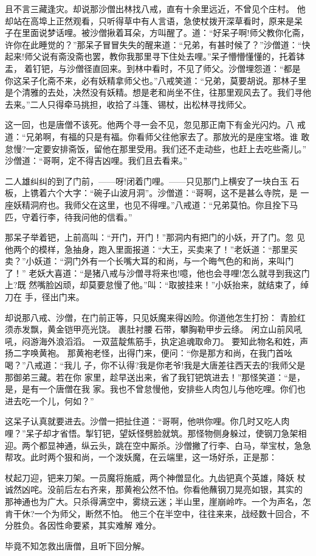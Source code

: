 且不言三藏逢灾。却说那沙僧出林找八戒，直有十余里远近，不曾见个庄村。
他却站在高埠上正然观看，只听得草中有人言语，急使杖拨开深草看时，原来是呆
子在里面说梦话哩。被沙僧揪着耳朵，方叫醒了。道：“好呆子啊!师父教你化斋，
许你在此睡觉的？”那呆子冒冒失失的醒来道：“兄弟，有甚时候了？”沙僧道：“快
起来!师父说有斋没斋也罢，教你我那里寻下住处去哩。”呆子懵懵懂懂的，托着钵
盂，着钉钯，与沙僧径直回来。到林中看时，不见了师父。沙僧埋怨道：“都是
你这呆子化斋不来，必有妖精拿师父也。”八戒笑道：“兄弟，莫要胡说。那林子里
是个清雅的去处，决然没有妖精。想是老和尚坐不住，往那里观风去了。我们寻他
去来。”二人只得牵马挑担，收拾了斗篷、锡杖，出松林寻找师父。

这一回，也是唐僧不该死。他两个寻一会不见，忽见那正南下有金光闪灼。八
戒道：“兄弟啊，有福的只是有福。你看师父往他家去了。那放光的是座宝塔。谁
敢怠慢?一定要安排斋饭，留他在那里受用。我们还不走动些，也赶上去吃些斋儿。”
沙僧道：“哥啊，定不得吉凶哩。我们且去看来。”

二人雄纠纠的到了门前，——呀!闭着门哩。——只见那门上横安了一块白玉
石板，上镌着六个大字：“碗子山波月洞”。沙僧道：“哥啊，这不是甚么寺院，是
一座妖精洞府也。我师父在这里，也见不得哩。”八戒道：“兄弟莫怕。你且拴下马
匹，守着行李，待我问他的信看。”

那呆子举着钯，上前高叫：“开门，开门！”那洞内有把门的小妖，开了门。忽
见他两个的模样，急抽身，跑入里面报道：“大王，买卖来了！”老妖道：“那里买
卖？”小妖道：“洞门外有一个长嘴大耳的和尚，与一个晦气色的和尚，来叫门了！”
老妖大喜道：“是猪八戒与沙僧寻将来也!噫，他也会寻哩!怎么就寻到我这门上?既
然嘴脸凶顽，却莫要怠慢了他。”叫：“取披挂来！”小妖抬来，就结束了，绰刀在
手，径出门来。

却说那八戒、沙僧，在门前正等，只见妖魔来得凶险。你道他怎生打扮：
青脸红须赤发飘，黄金铠甲亮光饶。
裹肚衬腰石带，攀胸勒甲步云绦。
闲立山前风吼吼，闷游海外浪滔滔。
一双蓝靛焦筋手，执定追魂取命刀。
要知此物名和姓，声扬二字唤黄袍。
那黄袍老怪，出得门来，便问：“你是那方和尚，在我门首吆喝？”八戒道：“我儿
子，你不认得?我是你老爷!我是大唐差往西天去的!我师父是那御弟三藏。若在你
家里，趁早送出来，省了我钉钯筑进去！”那怪笑道：“是，是，是有一个唐僧在我
家。我也不曾怠慢他，安排些人肉包儿与他吃哩。你们也进去吃一个儿，何如？”

这呆子认真就要进去。沙僧一把扯住道：“哥啊，他哄你哩。你几时又吃人肉
哩？”呆子却才省悟。掣钉钯，望妖怪劈脸就筑。那怪物侧身躲过，使钢刀急架相
迎。两个都显神通，纵云头，跳在空中厮杀。沙僧撇了行李、白马，举宝杖，急急
帮攻。此时两个狠和尚，一个泼妖魔，在云端里，这一场好杀，正是那：

杖起刀迎，钯来刀架。一员魔将施威，两个神僧显化。九齿钯真个英雄，降妖
杖诚然凶咤。没前后左右齐来，那黄袍公然不怕。你看他蘸钢刀晃亮如银，其实的
那神通也为广大。只杀得满空中，雾绕云迷；半山里，崖崩岭咋。一个为声名，怎
肯干休?一个为师父，断然不怕。
他三个在半空中，往往来来，战经数十回合，不分胜负。各因性命要紧，其实难解
难分。

毕竟不知怎救出唐僧，且听下回分解。